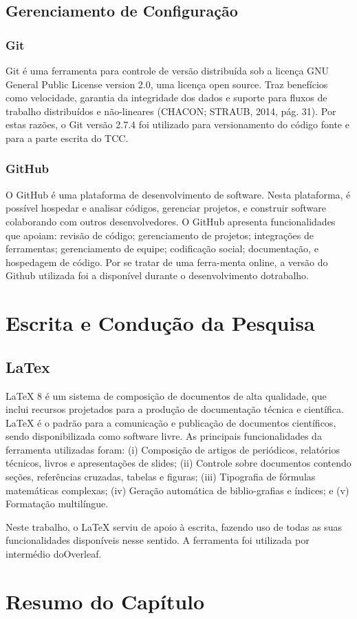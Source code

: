 \subsection{Gerenciamento de Configuração}

\subsubsection{Git}
Git é uma ferramenta para controle de versão distribuída sob a licença GNU General Public License version 2.0, uma licença open source. Traz benefícios como velocidade, garantia da integridade dos dados e suporte para fluxos de trabalho distribuídos e não-lineares (CHACON; STRAUB, 2014, pág. 31). Por estas razões, o Git versão 2.7.4 foi utilizado para versionamento do código fonte e para a parte escrita do TCC.

\subsubsection{GitHub}

O GitHub é uma plataforma de desenvolvimento de software. Nesta plataforma, é possível hospedar e analisar códigos, gerenciar projetos, e construir software colaborando com outros desenvolvedores. O GitHub apresenta funcionalidades que apoiam: revisão de código; gerenciamento de projetos; integrações de ferramentas; gerenciamento de equipe; codificação social; documentação, e hospedagem de código. Por se tratar de uma ferra-menta online, a versão do Github utilizada foi a disponível durante o desenvolvimento dotrabalho.

\section{Escrita e Condução da Pesquisa}

\subsection{LaTex}
LaTeX 8 é um sistema de composição de documentos de alta qualidade, que inclui recursos projetados para a produção de documentação técnica e científica. LaTeX é o padrão para a comunicação e publicação de documentos científicos, sendo disponibilizada como software livre. As principais funcionalidades da ferramenta utilizadas foram:
(i) Composição de artigos de periódicos, relatórios técnicos, livros e apresentações de slides;
(ii) Controle sobre documentos contendo seções, referências cruzadas, tabelas e figuras;
(iii) Tipografia de fórmulas matemáticas complexas; (iv) Geração automática de biblio-grafias e índices; e (v) Formatação multilíngue.

Neste trabalho, o LaTeX serviu de apoio à escrita, fazendo uso de todas as suas funcionalidades disponíveis nesse sentido. A ferramenta foi utilizada por intermédio doOverleaf.
\section{Resumo do Capítulo}


